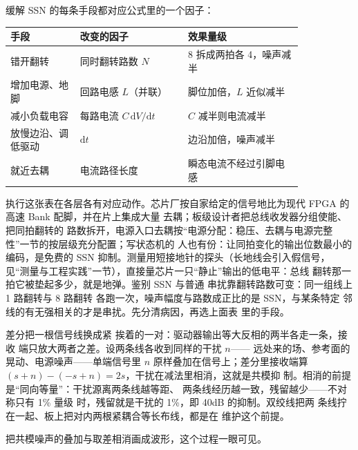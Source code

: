 缓解 SSN 的每条手段都对应公式里的一个因子：

\begin{longtable}{L{0.2\linewidth}L{0.31\linewidth}L{0.33\linewidth}}
\toprule
手段 & 改变的因子 & 效果量级 \\
\midrule
错开翻转 & 同时翻转路数 $N$ & 8 拆成两拍各 4，噪声减半 \\\tablerowrule
增加电源、地脚 & 回路电感 $L$（并联） & 脚位加倍，$L$ 近似减半 \\\tablerowrule
减小负载电容 & 每路电流 $C\,\mathrm{d}V/\mathrm{d}t$ & $C$ 减半则电流减半 \\\tablerowrule
放慢边沿、调低驱动 & $\mathrm{d}t$ & 边沿加倍，噪声减半 \\\tablerowrule
就近去耦 & 电流路径长度 & 瞬态电流不经过引脚电感 \\
\bottomrule
\end{longtable}

执行这张表在各层各有对应动作。芯片厂按自家给定的信号地比为现代 FPGA 的高速 Bank 配脚，并在片上集成大量
去耦；板级设计者把总线收发器分组使能、把同拍翻转的
路数拆开，电源入口去耦按“电源分配：稳压、去耦与电源完整性”一节的按层级充分配置；写状态机的
人也有份：让同拍变化的输出位数最小的编码，是免费的
SSN 抑制。测量用短接地针的探头（长地线会引入假信号，
见“测量与工程实践”一节），直接量芯片一只“静止”输出的低电平：总线
翻转那一拍它被垫起多少，就是地弹。鉴别 SSN 与普通
串扰靠翻转路数可变：同一组线上 1 路翻转与 8 路翻转
各跑一次，噪声幅度与路数成正比的是 SSN，与某条特定
邻线的有无强相关的才是串扰。先分清病因，再选上面表
里的手段。

差分把一根信号线换成紧
挨着的一对：驱动器输出等大反相的两半各走一条，接收
端只放大两者之差。设两条线各收到同样的干扰 $n$——
远处来的场、参考面的晃动、电源噪声——单端信号里
$n$ 原样叠加在信号上；差分里接收端算
$(s+n)-(-s+n)=2s$，干扰在减法里相消，这就是共模抑
制。相消的前提是“同向等量”：干扰源离两条线越等距、
两条线经历越一致，残留越少——不对称只有 1\% 量级
时，残留就是干扰的 1\%，即 40dB 的抑制。双绞线把两
条线拧在一起、板上把对内两根紧耦合等长布线，都是在
维护这个前提。

把共模噪声的叠加与取差相消画成波形，这个过程一眼可见。

